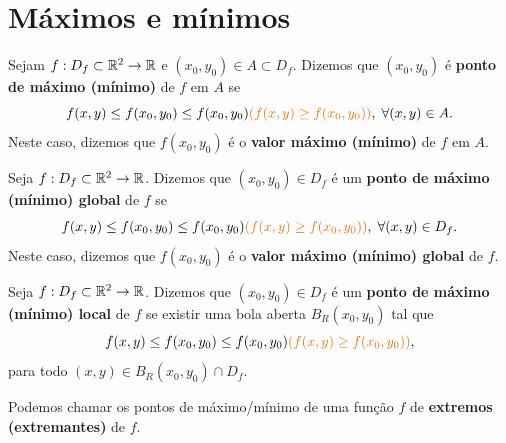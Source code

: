 \section{Máximos e mínimos}

\begin{definition}
    Sejam \(f:D_f\subset\mathbb{R}^2\to\mathbb{R}\) e \((x_0,y_0)\in A \subset D_f\). Dizemos que \((x_0,y_0)\) é \textbf{ponto de máximo {\co(mínimo)}} de \(f\) em \(A\) se \[f(x,y) \leq f(x_0,y_0) \leq f(x_0,y_0) {\co (f(x,y) \geq f(x_0,y_0))},\; \forall (x,y)\in A.\] Neste caso, dizemos que \(f(x_0,y_0)\) é o \textbf{valor máximo {\co (mínimo)}} de \(f\) em \(A\).

\end{definition}

\begin{definition}
    Seja \(f: D_f \subset\mathbb{R}^2 \to \mathbb{R}\). Dizemos que \((x_0,y_0)\in D_f\) é um \textbf{ponto de máximo {\co (mínimo)} global} de \(f\) se \[f(x,y) \leq f(x_0,y_0) \leq f(x_0,y_0) {\co (f(x,y) \geq f(x_0,y_0))},\; \forall (x,y)\in D_f.\] Neste caso, dizemos que \(f(x_0,y_0)\) é o \textbf{valor máximo {\co (mínimo) global}} de \(f\).
\end{definition}

\begin{definition}
    Seja \(f:D_f \subset \mathbb{R}^2 \to \mathbb{R}\). Dizemos que \((x_0,y_0)\in D_f\) é um \textbf{ponto de máximo {\co(mínimo)} local} de \(f\) se existir uma bola aberta \(B_R(x_0,y_0)\) tal que \[f(x,y) \leq f(x_0,y_0) \leq f(x_0,y_0) {\co (f(x,y) \geq f(x_0,y_0))},\] para todo \((x,y)\in B_R(x_0,y_0)\cap D_f.\)
\end{definition}

\begin{remark}
    Podemos chamar os pontos de máximo/mínimo de uma função \(f\) de \textbf{extremos (extremantes)} de \(f\).
\end{remark}

